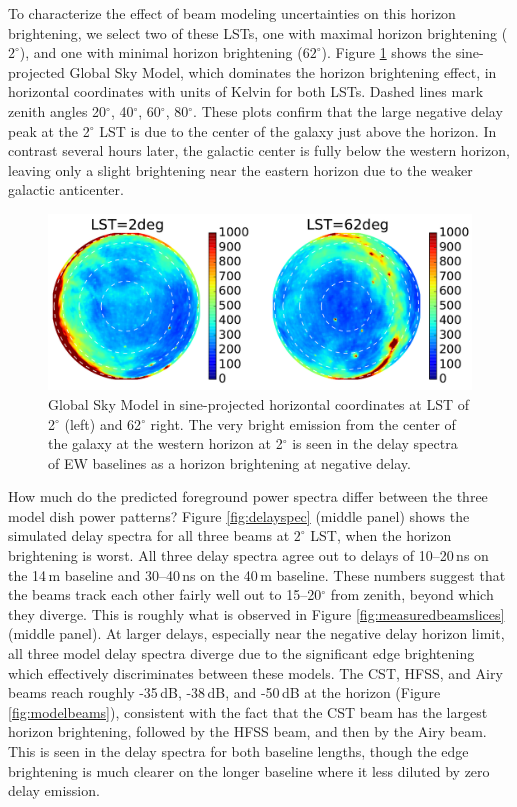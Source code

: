 \documentclass{emulateapj}
\begin{document}
To characterize the effect of beam modeling uncertainties on this horizon brightening, we select two of these LSTs, one with maximal horizon brightening ($2^\circ$), and one with minimal horizon brightening ($62^\circ$). Figure \ref{fig:gsmplots} shows the sine-projected Global Sky Model, which dominates the horizon brightening effect, in horizontal coordinates with units of Kelvin for both LSTs. Dashed lines mark zenith angles 20$^\circ$, 40$^\circ$, 60$^\circ$, 80$^\circ$. These plots confirm that the large negative delay peak at the 2$^\circ$ LST is due to the center of the galaxy just above the horizon. In contrast several hours later, the galactic center is fully below the western horizon, leaving only a slight brightening near the eastern horizon due to the weaker galactic anticenter. 

\begin{figure}[h]
\centering
\includegraphics[width=6in]{gsm_kelvin_LST_2deg_and_62deg.pdf}
\caption{Global Sky Model \citep{gsm} in sine-projected horizontal coordinates at LST of 2$^\circ$ (left) and 62$^\circ$ right. The very bright emission from the center of the galaxy at the western horizon at 2$^\circ$ is seen in the delay spectra of EW baselines as a horizon brightening at negative delay.}
\label{fig:gsmplots}
\end{figure}

How much do the predicted foreground power spectra differ between the three model dish power patterns? Figure \ref{fig:delayspec} (middle panel) shows the simulated delay spectra for all three beams at $2^\circ$ LST, when the horizon brightening is worst. All three delay spectra agree out to delays of 10--20\,ns on the 14\,m baseline and 30--40\,ns on the 40\,m baseline. These numbers suggest that the beams track each other fairly well out to 15--20$^\circ$ from zenith, beyond which they diverge. This is roughly what is observed in Figure \ref{fig:measuredbeamslices} (middle panel). At larger delays, especially near the negative delay horizon limit, all three model delay spectra diverge due to the significant edge brightening which effectively discriminates between these models. The CST, HFSS, and Airy beams reach roughly -35\,dB, -38\,dB, and -50\,dB at the horizon (Figure \ref{fig:modelbeams}), consistent with the fact that the CST beam has the largest horizon brightening, followed by the HFSS beam, and then by the Airy beam. This is seen in the delay spectra for both baseline lengths, though the edge brightening is much clearer on the longer baseline where it less diluted by zero delay emission.  
\end{document}
